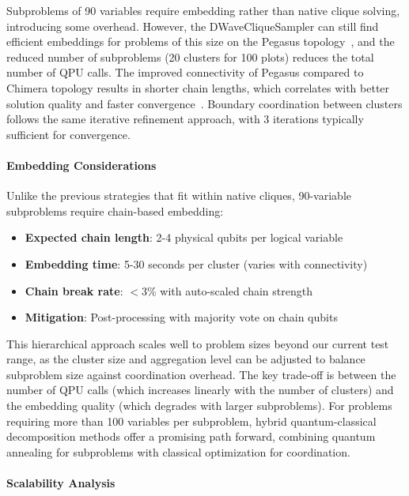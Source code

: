 \documentclass{oqireport}
\begin{document}
Subproblems of 90 variables require embedding rather than native clique solving, introducing some overhead. However, the DWaveCliqueSampler can still find efficient embeddings for problems of this size on the Pegasus topology~\cite{boothler2022benchmarking}, and the reduced number of subproblems (20 clusters for 100 plots) reduces the total number of QPU calls. The improved connectivity of Pegasus compared to Chimera topology results in shorter chain lengths, which correlates with better solution quality and faster convergence~\cite{dwave2020advantage}. Boundary coordination between clusters follows the same iterative refinement approach, with 3 iterations typically sufficient for convergence.

\paragraph{Embedding Considerations}

Unlike the previous strategies that fit within native cliques, 90-variable subproblems require chain-based embedding:
\begin{itemize}
    \item \textbf{Expected chain length}: 2-4 physical qubits per logical variable
    \item \textbf{Embedding time}: 5-30 seconds per cluster (varies with connectivity)
    \item \textbf{Chain break rate}: $<$3\% with auto-scaled chain strength
    \item \textbf{Mitigation}: Post-processing with majority vote on chain qubits
\end{itemize}

This hierarchical approach scales well to problem sizes beyond our current test range, as the cluster size and aggregation level can be adjusted to balance subproblem size against coordination overhead. The key trade-off is between the number of QPU calls (which increases linearly with the number of clusters) and the embedding quality (which degrades with larger subproblems). For problems requiring more than 100 variables per subproblem, hybrid quantum-classical decomposition methods offer a promising path forward, combining quantum annealing for subproblems with classical optimization for coordination.

\paragraph{Scalability Analysis}
\end{document}

